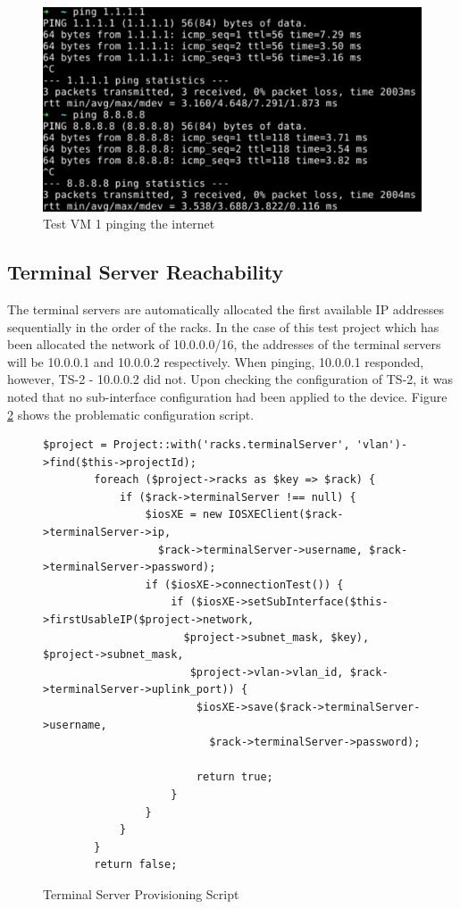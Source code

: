 \begin{figure}[H]
    \centering
    \includegraphics[scale=0.5]{images/test-project-1-ping-internet.png}
    \caption{Test VM 1 pinging the internet}
    \label{fig:test-project-1-ping-internet}
\end{figure}

\subsection{Terminal Server Reachability}

The terminal servers are automatically allocated the first available IP addresses sequentially in the order of the racks. In the case of this test project which has been allocated the network of 10.0.0.0/16, the addresses of the terminal servers will be 10.0.0.1 and 10.0.0.2 respectively. When pinging, 10.0.0.1 responded, however, TS-2 - 10.0.0.2 did not. Upon checking the configuration of TS-2, it was noted that no sub-interface configuration had been applied to the device. Figure \ref{fig:terminal-server-provision-bug} shows the problematic configuration script.

\begin{figure}[H]
    \begin{lstlisting}[basicstyle=\scriptsize]
        $project = Project::with('racks.terminalServer', 'vlan')->find($this->projectId);
        foreach ($project->racks as $key => $rack) {
            if ($rack->terminalServer !== null) {
                $iosXE = new IOSXEClient($rack->terminalServer->ip,
                  $rack->terminalServer->username, $rack->terminalServer->password);
                if ($iosXE->connectionTest()) {
                    if ($iosXE->setSubInterface($this->firstUsableIP($project->network,
                      $project->subnet_mask, $key), $project->subnet_mask,
                       $project->vlan->vlan_id, $rack->terminalServer->uplink_port)) {
                        $iosXE->save($rack->terminalServer->username,
                          $rack->terminalServer->password);

                        return true;
                    }
                }
            }
        }
        return false;

    \end{lstlisting}
    \caption{Terminal Server Provisioning Script}
    \label{fig:terminal-server-provision-bug}
\end{figure}

